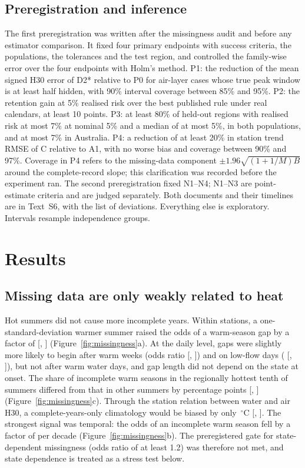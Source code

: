\documentclass[draft]{agujournal2025}
\begin{document}
\subsection{Preregistration and inference}
The first preregistration was written after the missingness audit and before any estimator comparison. It fixed four primary endpoints with success criteria, the populations, the tolerances and the test region, and controlled the family-wise error over the four endpoints with Holm's method. P1: the reduction of the mean signed H30 error of D2* relative to P0 for air-layer cases whose true peak window is at least half hidden, with 90\% interval coverage between 85\% and 95\%. P2: the retention gain at 5\% realised risk over the best published rule under real calendars, at least 10 points. P3: at least 80\% of held-out regions with realised risk at most 7\% at nominal 5\% and a median of at most 5\%, in both populations, and at most 7\% in Australia. P4: a reduction of at least 20\% in station trend RMSE of C relative to A1, with no worse bias and coverage between 90\% and 97\%. Coverage in P4 refers to the missing-data component $\pm1.96\sqrt{(1+1/M)B}$ around the complete-record slope; this clarification was recorded before the experiment ran. The second preregistration fixed N1--N4; N1--N3 are point-estimate criteria and are judged separately. Both documents and their timelines are in Text~S6, with the list of deviations. Everything else is exploratory. Intervals resample independence groups.

\section{Results}

\subsection{Missing data are only weakly related to heat}
Hot summers did not cause more incomplete years. Within stations, a one-standard-deviation warmer summer raised the odds of a warm-season gap by a factor of \TOrAir{} [\TOrAirLow, \TOrAirHigh] (Figure~\ref{fig:missingness}a). At the daily level, gaps were slightly more likely to begin after warm weeks (odds ratio \TOrOnset{} [\TOrOnsetLow, \TOrOnsetHigh]) and on low-flow days (\TOrLowFlow{} [\TOrLowFlowLow, \TOrLowFlowHigh]), but not after warm water days, and gap length did not depend on the state at onset. The share of incomplete warm seasons in the regionally hottest tenth of summers differed from that in other summers by \THotContrast{} percentage points [\THotContrastLow, \THotContrastHigh] (Figure~\ref{fig:missingness}c). Through the station relation between water and air H30, a complete-years-only climatology would be biased by only \TImpliedBias\,$^{\circ}$C [\TImpliedBiasLow, \TImpliedBiasHigh]. The strongest signal was temporal: the odds of an incomplete warm season fell by a factor of \TOrDecade{} per decade (Figure~\ref{fig:missingness}b). The preregistered gate for state-dependent missingness (odds ratio of at least 1.2) was therefore not met, and state dependence is treated as a stress test below.
\end{document}
